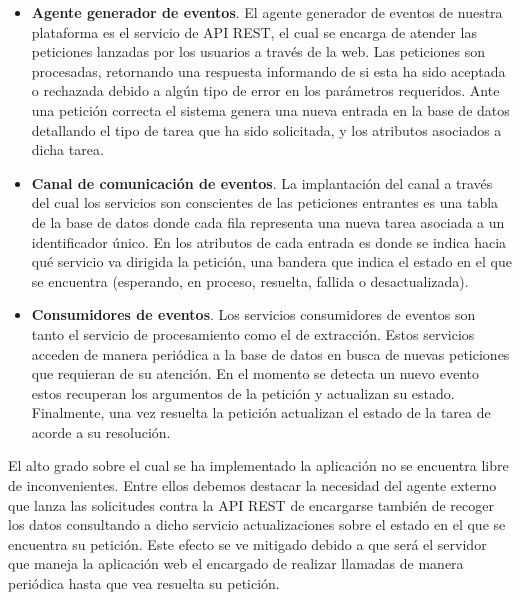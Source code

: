 \vspace{-0.5cm}
\begin{itemize}
\item [\textbullet] \textbf{Agente generador de eventos}. El agente generador de eventos de nuestra plataforma es el servicio de API REST, el cual se encarga de atender las peticiones lanzadas por los usuarios a través de la web. Las peticiones son procesadas, retornando una respuesta informando de si esta ha sido aceptada o rechazada debido a algún tipo de error en los parámetros requeridos.  Ante una petición correcta el sistema genera una nueva entrada en la base de datos detallando el tipo de tarea que ha sido solicitada, y los atributos asociados a dicha tarea.
\item [\textbullet] \textbf{Canal de comunicación de eventos}. La implantación del canal a través del cual los servicios son conscientes de las peticiones entrantes es una tabla de la base de datos donde cada fila representa una nueva tarea asociada a un identificador único. En los atributos de cada entrada es donde se indica hacia qué servicio va dirigida la petición, una bandera que indica el estado en el que se encuentra (esperando, en proceso, resuelta, fallida o desactualizada).
\item [\textbullet] \textbf{Consumidores de eventos}. Los servicios consumidores de eventos son tanto el servicio de procesamiento como el de extracción. Estos servicios acceden de manera periódica a la base de datos en busca de nuevas peticiones que requieran de su atención. En el momento se detecta un nuevo evento estos recuperan los argumentos de la petición y actualizan su estado. Finalmente, una vez resuelta la petición actualizan el estado de la tarea de acorde a su resolución.
\end{itemize}

El alto grado sobre el cual se ha implementado la aplicación no se encuentra libre de inconvenientes. Entre ellos debemos destacar la necesidad del agente externo que lanza las solicitudes contra la API REST de encargarse también de recoger los datos consultando a dicho servicio actualizaciones sobre el estado en el que se encuentra su petición. Este efecto se ve mitigado debido a que será el servidor que maneja la aplicación web el encargado de realizar llamadas de manera periódica hasta que vea resuelta su petición.
